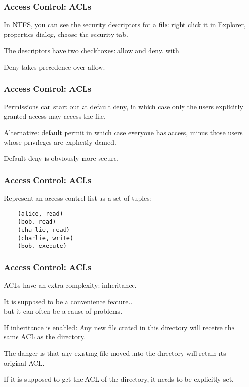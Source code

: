 \begin{frame}
\frametitle{Access Control: ACLs}
\begin{changemargin}{1cm}

In NTFS, you can see the security descriptors for a file: right click it in Explorer, properties dialog, choose the security tab. 

The descriptors have two checkboxes: allow and deny, with 

Deny takes precedence over allow.

\end{changemargin}
\end{frame}

\begin{frame}
\frametitle{Access Control: ACLs}
\begin{changemargin}{1cm}

Permissions can start out at \alert{default deny}, in which case only the users explicitly granted access may access the file.

Alternative: \alert{default permit} in which case everyone has access, minus those users whose privileges are explicitly denied. 

Default deny is obviously more secure.

\end{changemargin}
\end{frame}

\begin{frame}[fragile]
\frametitle{Access Control: ACLs}
\begin{changemargin}{1cm}

Represent an access control list as a set of tuples:
\begin{verbatim}
	(alice, read)
	(bob, read)
	(charlie, read)
	(charlie, write)
	(bob, execute)
\end{verbatim}

\end{changemargin}
\end{frame}

\begin{frame}
\frametitle{Access Control: ACLs}
\begin{changemargin}{1cm}

ACLs have an extra complexity: inheritance.

It is supposed to be a convenience feature...\\
\quad but it can often be a cause of problems.

If inheritance is enabled: 
Any new file crated in this directory will receive the same ACL as the directory.

The danger is that any existing file moved into the directory will retain its original ACL. 

If it is supposed to get the ACL of the directory, it needs to be explicitly set.

\end{changemargin}
\end{frame}


